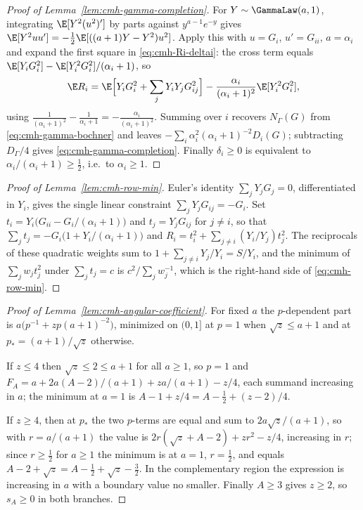 \documentclass[../../main.tex]{subfiles}
\begin{document}
\begin{proof}[Proof of Lemma~\ref{lem:cmh-gamma-completion}]
For $Y\sim\GammaLaw(a,1)$, integrating $\E[Y^2(u^2)']$ by parts against $y^{a-1}e^{-y}$ gives
$\E[Y^2uu']=-\tfrac12\E[((a+1)Y-Y^2)u^2]$. Apply this with $u=G_i$, $u'=G_{ii}$, $a=\alpha_i$
and expand the first square in \eqref{eq:cmh-Ri-deltai}: the cross term equals
$\E[Y_iG_i^2]-\E[Y_i^2G_i^2]/(\alpha_i+1)$, so
\[
  \E R_i=\E\Bigl[Y_iG_i^2+\sum_jY_iY_jG_{ij}^2\Bigr]
        -\frac{\alpha_i}{(\alpha_i+1)^2}\E[Y_i^2G_i^2],
\]
using $\tfrac1{(\alpha_i+1)^2}-\tfrac1{\alpha_i+1}=-\tfrac{\alpha_i}{(\alpha_i+1)^2}$. Summing
over $i$ recovers $N_\Gamma(G)$ from \eqref{eq:cmh-gamma-bochner} and leaves
$-\sum_i\alpha_i^2(\alpha_i+1)^{-2}D_i(G)$; subtracting $D_\Gamma/4$ gives
\eqref{eq:cmh-gamma-completion}. Finally $\delta_i\ge0$ is equivalent to
$\alpha_i/(\alpha_i+1)\ge\tfrac12$, i.e.\ to $\alpha_i\ge1$.
\end{proof}

\begin{proof}[Proof of Lemma~\ref{lem:cmh-row-min}]
Euler's identity $\sum_jY_jG_j=0$, differentiated in $Y_i$, gives the single linear constraint
$\sum_jY_jG_{ij}=-G_i$. Set $t_i=Y_i\bigl(G_{ii}-G_i/(\alpha_i+1)\bigr)$ and $t_j=Y_jG_{ij}$
for $j\ne i$, so that
$\sum_jt_j=-G_i\bigl(1+Y_i/(\alpha_i+1)\bigr)$ and
$R_i=t_i^2+\sum_{j\ne i}(Y_i/Y_j)t_j^2$. The reciprocals of these quadratic weights sum to
$1+\sum_{j\ne i}Y_j/Y_i=S/Y_i$, and the minimum of $\sum_jw_jt_j^2$ under $\sum_jt_j=c$ is
$c^2/\sum_jw_j^{-1}$, which is the right-hand side of \eqref{eq:cmh-row-min}.
\end{proof}

\begin{proof}[Proof of Lemma~\ref{lem:cmh-angular-coefficient}]
For fixed $a$ the $p$-dependent part is $a\bigl(p^{-1}+zp(a+1)^{-2}\bigr)$, minimized on
$(0,1]$ at $p=1$ when $\sqrt z\le a+1$ and at $p_*=(a+1)/\sqrt z$ otherwise.

If $z\le4$ then $\sqrt z\le2\le a+1$ for all $a\ge1$, so $p=1$ and
$F_A=a+2a(A-2)/(a+1)+za/(a+1)-z/4$, each summand increasing in $a$; the minimum at $a=1$ is
$A-1+z/4=A-\tfrac12+(z-2)/4$.

If $z\ge4$, then at $p_*$ the two $p$-terms are equal and sum to $2a\sqrt z/(a+1)$, so with
$r=a/(a+1)$ the value is $2r(\sqrt z+A-2)+zr^2-z/4$, increasing in $r$; since $r\ge\tfrac12$ for
$a\ge1$ the minimum is at $a=1$, $r=\tfrac12$, and equals $A-2+\sqrt z=A-\tfrac12+\sqrt z-\tfrac32$.
In the complementary region the expression is increasing in $a$ with a boundary value no
smaller. Finally $A\ge3$ gives $z\ge2$, so $s_A\ge0$ in both branches.
\end{proof}
\end{document}
